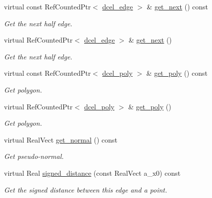 \begin{DoxyCompactItemize}
virtual const Ref\+Counted\+Ptr$<$ \hyperlink{classdcel__edge}{dcel\+\_\+edge} $>$ \& \hyperlink{classdcel__edge_aba6969e9ef8fb37e7ad513a1e664bef0}{get\+\_\+next} () const 
\begin{DoxyCompactList}\small\item\em Get the next half edge. \end{DoxyCompactList}\item 
virtual Ref\+Counted\+Ptr$<$ \hyperlink{classdcel__edge}{dcel\+\_\+edge} $>$ \& \hyperlink{classdcel__edge_abe52e9664a1ad5fc5b371e4acc3f19ba}{get\+\_\+next} ()
\begin{DoxyCompactList}\small\item\em Get the next half edge. \end{DoxyCompactList}\item 
virtual const Ref\+Counted\+Ptr$<$ \hyperlink{classdcel__poly}{dcel\+\_\+poly} $>$ \& \hyperlink{classdcel__edge_a13066704c4128ef6628aa01049765555}{get\+\_\+poly} () const 
\begin{DoxyCompactList}\small\item\em Get polygon. \end{DoxyCompactList}\item 
virtual Ref\+Counted\+Ptr$<$ \hyperlink{classdcel__poly}{dcel\+\_\+poly} $>$ \& \hyperlink{classdcel__edge_a804a1d0a6f7727c3f2d01219b9b70d7e}{get\+\_\+poly} ()
\begin{DoxyCompactList}\small\item\em Get polygon. \end{DoxyCompactList}\item 
virtual Real\+Vect \hyperlink{classdcel__edge_a8806928fd1edcd7cee053c647f60ef23}{get\+\_\+normal} () const 
\begin{DoxyCompactList}\small\item\em Get pseudo-\/normal. \end{DoxyCompactList}\item 
virtual Real \hyperlink{classdcel__edge_a750175015cf570ff805d238bd6d5cb64}{signed\+\_\+distance} (const Real\+Vect a\+\_\+x0) const 
\begin{DoxyCompactList}\small\item\em Get the signed distance between this edge and a point. \end{DoxyCompactList}\end{DoxyCompactItemize}
